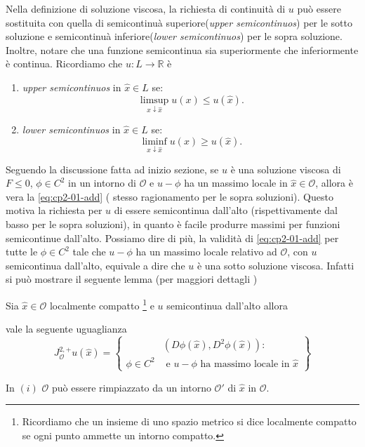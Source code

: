 \begin{osservazione}
\label{oss:cp2-01}
Nella definizione di soluzione viscosa, la richiesta di continuità di $u$ può essere sostituita con quella di semicontinuà superiore(\emph{upper semicontinuos}) per le sotto soluzione e semicontinuà inferiore(\emph{lower semicontinuos}) per le sopra soluzione. Inoltre, notare che una funzione semicontinua sia superiormente che inferiormente è continua. Ricordiamo che  $u:L \to\mathbb{R}$ è
\begin{enumerate}
  \item \emph{upper semicontinuos} in $\hat{x}\in L$ se:
    \[
      \limsup_{x\downarrow\hat{x}}u(x)\leq u(\hat{x}).
    \]
  \item \emph{lower semicontinuos} in $\hat{x}\in L$ se:
    \[
      \liminf_{x\downarrow\hat{x}}u(x)\geq u(\hat{x}).
    \]
\end{enumerate}  

Seguendo la discussione fatta ad inizio sezione, se $u$ è una soluzione viscosa di $F\leq 0$, $\phi\in C^2$ in un intorno di $\mathcal{O}$ e $u-\phi$ ha un massimo locale in $\hat{x}\in\mathcal{O}$, allora è vera la \eqref{eq:cp2-01-add} ( stesso ragionamento per le sopra soluzioni). Questo motiva la richiesta per $u$ di essere semicontinua dall'alto (rispettivamente dal basso per le sopra soluzioni), in quanto è facile produrre massimi per funzioni semicontinue dall'alto.
Possiamo dire di più, la validità di \eqref{eq:cp2-01-add} per tutte le $\phi\in C^2$ tale che $u-\phi$ ha un massimo locale relativo ad $\mathcal{O}$, con $u$ semicontinua dall'alto, equivale a dire che $u$ è una sotto soluzione viscosa.  Infatti si può mostrare il seguente lemma (per maggiori dettagli \cite[vedi][§3]{giga:main})
\begin{lemma}
  \label{lem:cp2-01}
 Sia $\hat{x}\in\mathcal{O}$ localmente compatto%
\footnote{ Ricordiamo che un insieme di uno spazio metrico si dice localmente compatto se ogni punto ammette un intorno compatto.}
 e $u$ semicontinua dall'alto allora
\begin{enumi}
  \item  vale la seguente uguaglianza
\[
J_{\mathcal{O}}^{2,+}u(\hat{x}) = \left\{
\begin{aligned}
&(D\phi(\hat{x}),D^2\phi(\hat{x})):\\
\phi\in C^2&\text{ e $u-\phi$ ha massimo locale in $\hat{x}$}
\end{aligned}
\right\}
\]
  \item  In $(i)$ $\mathcal{O}$ può essere rimpiazzato da un intorno $\mathcal{O}'$ di $\hat{x}$ in $\mathcal{O}$.
\end{enumi}
\end{lemma}


\end{osservazione}
